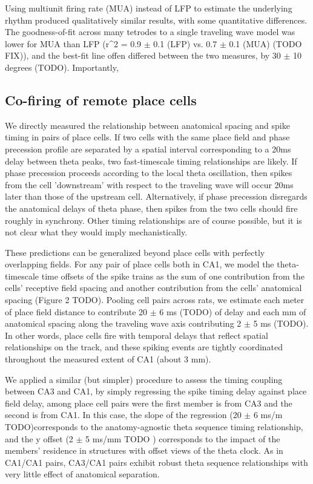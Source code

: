\documentclass[10pt]{article}
\begin{document}
Using multiunit firing rate (MUA) instead of LFP to estimate the underlying rhythm produced qualitatively similar results, with some quantitative differences. The goodness-of-fit across many tetrodes to a single traveling wave model was lower for MUA than LFP (r^2 = 0.9 $\pm$ 0.1 (LFP) vs. 0.7 $\pm$ 0.1 (MUA) (TODO FIX)), and the best-fit line offen differed between the two measures, by 30 $\pm$ 10 degrees (TODO). Importantly, 

\subsection*{Co-firing of remote place cells}
We directly measured the relationship between anatomical spacing and spike timing in pairs of place cells. If two cells with the same place field and phase precession profile are separated by a spatial interval corresponding to a 20ms delay between theta peaks, two fast-timescale timing relationships are likely. If phase precession proceeds according to the local theta oscillation, then spikes from the cell 'downstream' with respect to the traveling wave will occur 20ms later than those of the upstream cell. Alternatively, if phase precession disregards the anatomical delays of theta phase, then spikes from the two cells should fire roughly in synchrony. Other timing relationships are of course possible, but it is not clear what they would imply mechanistically.

These predictions can be generalized beyond place cells with perfectly overlapping fields. For any pair of place cells both in CA1, we model the theta-timescale time offsets of the spike trains as the sum of one contribution from the cells' receptive field spacing and another contribution from the cells' anatomical spacing (Figure 2 TODO). Pooling cell pairs across rats, we estimate each meter of place field distance to contribute 20 $\pm$ 6 ms (TODO) of delay and each mm of anatomical spacing along the traveling wave axis contributing 2 $\pm$ 5 ms (TODO). In other words, place cells fire with temporal delays that reflect spatial relationships on the track, and these spiking events are tightly coordinated throughout the measured extent of CA1 (about 3 mm).

We applied a similar (but simpler) procedure to assess the timing coupling between CA3 and CA1, by simply regressing the spike timing delay against place field delay, among place cell pairs were the first member is from CA3 and the second is from CA1. In this case, the slope of the regression (20 $\pm$ 6 ms/m TODO)corresponds to the anatomy-agnostic theta sequence timing relationship, and the y offset (2 $\pm$ 5 ms/mm TODO ) corresponds to the impact of the members' residence in structures with offset views of the theta clock. As in CA1/CA1 pairs, CA3/CA1 pairs exhibit robust theta sequence relationships with very little effect of anatomical separation.
\end{document}
